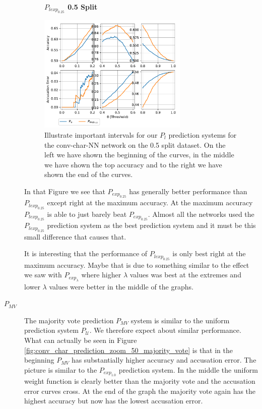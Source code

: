 \begin{description}
        \begin{figure}
            \centering
            \textbf{$P_{lexp_{0.25}}$ 0.5 Split}\par\medskip
            \includegraphics[width=0.7\textwidth]{./pictures/discussion/conv_char_nn_prediction_zoom_50_text_length_and_time}
            \caption{Illustrate important intervals for our $P_l$ prediction
                systems for the \gls{conv-char-NN} network on the 0.5 split
                dataset. On the left we have shown the beginning of the curves,
                in the middle we have shown the top accuracy and to the right we
                have shown the end of the curves.}
            \label{fig:conv_char_prediction_zoom_50_text_length_and_time}
        \end{figure}

        In that Figure we see that $P_{exp_{0.25}}$ has generally better
        performance than $P_{lexp_{0.25}}$ except right at the maximum accuracy.
        At the maximum accuracy $P_{lexp_{0.25}}$ is able to just barely beat
        $P_{exp_{0.25}}$. Almost all the networks used the $P_{lexp_{0.25}}$
        prediction system as the best prediction system and it must be this
        small difference that causes that.

        It is interesting that the performance of $P_{lexp_{0.25}}$ is only best
        right at the maximum accuracy. Maybe that is due to something similar to
        the effect we saw with $P_{exp_{\lambda}}$ where higher $\lambda$ values
        was best at the extremes and lower $\lambda$ values were better in the
        middle of the graphs.

    \item[$P_{MV}$]

        The majority vote prediction $P_{MV}$ system is similar to the
        uniform prediction system $P_{\mathcal{U}}$. We therefore expect
        about similar performance. What can actually be seen in Figure
        \ref{fig:conv_char_prediction_zoom_50_majority_vote} is that in the
        beginning $P_{MV}$ has substantially higher accuracy and accusation
        error. The picture is similar to the $P_{exp_{1.0}}$ prediction system.
        In the middle the uniform weight function is clearly better than the
        majority vote and the accusation error curves cross. At the end of the
        graph the majority vote again has the highest accuracy but now has the
        lowest accusation error.


\end{description}

